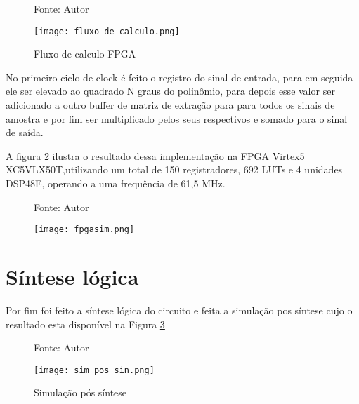 \begin{figure}[ht!]
	\centering
	\captionsetup{justification=centering}
	\caption*{Fonte: Autor}
	\texttt{[image: fluxo\_de\_calculo.png]}
	\caption{Fluxo de calculo FPGA}
	\label{fig:fluxocal}
\end{figure}

No primeiro ciclo de clock é feito o registro do sinal de entrada, para em seguida ele ser elevado ao quadrado N graus do polinômio, para depois esse valor ser adicionado a outro buffer de matriz de extração para para todos os sinais de amostra e por fim ser multiplicado pelos seus respectivos e somado para o sinal de saída.

A figura \ref{fig:simfpga} ilustra o resultado dessa implementação na  FPGA Virtex5 XC5VLX50T,utilizando um total de 150 registradores, 692 LUTs e 4 unidades DSP48E, operando a uma frequência de 61,5 MHz.
\begin{figure}[ht!]
	\centering
	\captionsetup{justification=centering}
	\caption*{Fonte: Autor}
	\texttt{[image: fpgasim.png]}
	\caption{}
	\label{fig:simfpga}
\end{figure}


\section{Síntese lógica}
Por fim foi feito a síntese lógica do circuito e feita a simulação pos síntese cujo o resultado esta disponível na Figura \ref{fig:simpost}

\begin{figure}[ht!]
	\centering
	\captionsetup{justification=centering}
	\caption*{Fonte: Autor}
	\texttt{[image: sim\_pos\_sin.png]}
	\caption{Simulação pós síntese}
	\label{fig:simpost}
\end{figure}
